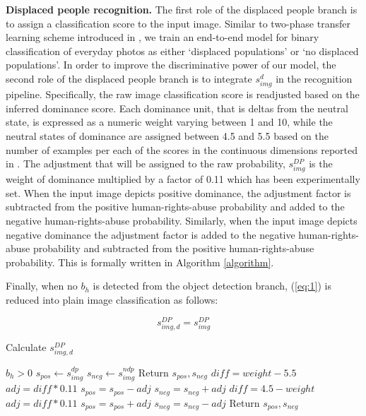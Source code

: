 \documentclass[10pt,twocolumn,letterpaper]{article}
\begin{document}
\noindent
\textbf{Displaced people recognition.} The first role of the displaced people branch is to assign a classification score to the input image. Similar to two-phase transfer learning scheme introduced in \cite{kalliatakis2019exploring}, we train an end-to-end model for binary classification of everyday photos as either `displaced populations' or `no displaced populations'. In order to improve the discriminative power of our model, the second role of the displaced people branch is to integrate $s_{img}^{d}$ in the recognition pipeline. Specifically, the raw image classification score  is readjusted based on the inferred dominance score. Each dominance unit, that is deltas from the neutral state, is expressed as a numeric weight varying between 1 and 10, while the neutral states of dominance are assigned between 4.5 and 5.5 based on the number of examples per each of the scores in the continuous dimensions reported in \cite{kosti2017emotion}.  The adjustment that will be assigned to the raw probability, $s_{img}^{DP}$ is the weight of dominance multiplied by a factor of 0.11 which has been experimentally set. When the input image depicts positive dominance, the adjustment factor is subtracted from the positive human-rights-abuse probability and added to the negative human-rights-abuse probability. Similarly, when the input image depicts negative dominance the adjustment factor is added to the negative human-rights-abuse probability and subtracted from the positive human-rights-abuse probability. This is formally written in Algorithm \ref{algorithm}.




Finally, when no $b_h$ is detected from the object detection branch, (\ref{eq:1}) is reduced into plain image classification as follows:

\begin{equation} \label{eq:6}
s_{img,d}^{DP} = s_{img}^{DP} 
\end{equation}

\begin{algorithm}[t!] \caption{Calculate $s_{img,d}^{DP}$} \label{algorithm} \begin{algorithmic} \REQUIRE $b_h > 0$
		\vskip 0.05in
		\STATE $s_{pos}\gets s_{img}^{dp}$ 
		\STATE $s_{neg}\gets s_{img}^{ndp}$ 
		\vskip 0.05in
		\STATE Return $s_{pos}, s_{neg}$
		\STATE $diff = weight-5.5$
		\STATE $adj = diff*0.11$
		\STATE $s_{pos} = s_{pos}-adj$
		\STATE $s_{neg} = s_{neg}+adj$
		\STATE $diff = 4.5-weight$
		\STATE $adj = diff*0.11$
		\STATE $s_{pos} = s_{pos}+adj$
		\STATE $s_{neg} = s_{neg}-adj$
		\ENDIF
		\STATE Return $s_{pos}, s_{neg}$
	\end{algorithmic}
\end{algorithm}
\end{document}
